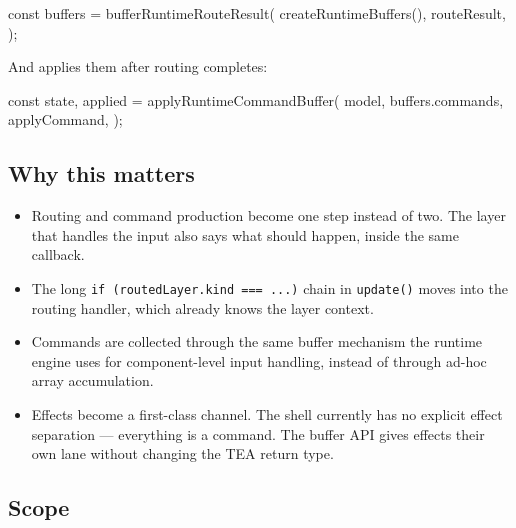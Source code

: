 \begin{CodeBlock}
const buffers = bufferRuntimeRouteResult(
  createRuntimeBuffers(),
  routeResult,
);
\end{CodeBlock}

And applies them after routing completes:

\begin{CodeBlock}
const { state, applied } = applyRuntimeCommandBuffer(
  model,
  buffers.commands,
  applyCommand,
);
\end{CodeBlock}

\subsection{Why this matters}\label{record-155-why-this-matters}

\begin{itemize}
\tightlist
\item
  Routing and command production become one step instead of two. The layer that handles the input also says what should happen, inside the same callback.
\item
  The long \texttt{i\allowbreak{}f\allowbreak{} \allowbreak{}(\allowbreak{}r\allowbreak{}o\allowbreak{}u\allowbreak{}t\allowbreak{}e\allowbreak{}d\allowbreak{}L\allowbreak{}a\allowbreak{}y\allowbreak{}e\allowbreak{}r\allowbreak{}.\allowbreak{}k\allowbreak{}i\allowbreak{}n\allowbreak{}d\allowbreak{} \allowbreak{}=\allowbreak{}=\allowbreak{}=\allowbreak{} \allowbreak{}.\allowbreak{}.\allowbreak{}.\allowbreak{})} chain in \texttt{u\allowbreak{}p\allowbreak{}d\allowbreak{}a\allowbreak{}t\allowbreak{}e\allowbreak{}(\allowbreak{})} moves into the routing handler, which already knows the layer context.
\item
  Commands are collected through the same buffer mechanism the runtime engine uses for component-level input handling, instead of through ad-hoc array accumulation.
\item
  Effects become a first-class channel. The shell currently has no explicit effect separation --- everything is a command. The buffer API gives effects their own lane without changing the TEA return type.
\end{itemize}

\subsection{Scope}\label{record-155-scope}

